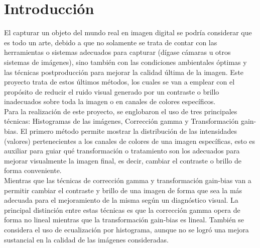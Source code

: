 \section{Introducción}
    El capturar un objeto del mundo real en imagen digital se podría considerar que es 
    todo un arte, debido a que no solamente se trata de contar con las herramientas 
    o sistemas adecuados para capturar (dígase cámaras u otros sistemas de imágenes), 
    sino también con las condiciones ambientales óptimas y las técnicas postproducción 
    para mejorar la calidad última de la imagen. Este proyecto trata de estos últimos 
    métodos, los cuales se van a emplear con el propósito de reducir el ruido visual 
    generado por un contraste o brillo inadecuados sobre toda la imagen o en canales 
    de colores específicos. \\

    Para la realización de este proyecto, se englobaron el uso de tres principales 
    técnicas: Histogramas de las imágenes, Corrección gamma y Transformación gain-bias. 
    El primero método permite mostrar la distribución de las intensidades (valores) 
    pertenecientes a los canales de colores de una imagen específicas, esto es auxiliar 
    para guiar qué transformación o tratamiento son los adecuados para mejorar visualmente 
    la imagen final, es decir, cambiar el contraste o brillo de forma conveniente.\\

    Mientras que las técnicas de corrección gamma y transformación gain-bias van a 
    permitir cambiar el contraste y brillo de una imagen de forma que sea la más 
    adecuada para el mejoramiento de la misma según un diagnóstico visual. La principal 
    distinción entre estas técnicas es que la corrección gamma opera de forma no 
    lineal mientras que la transformación gain-bias es lineal. También se considera 
    el uso de ecualización por histograma, aunque no se logró una mejora sustancial 
    en la calidad de las imágenes consideradas.